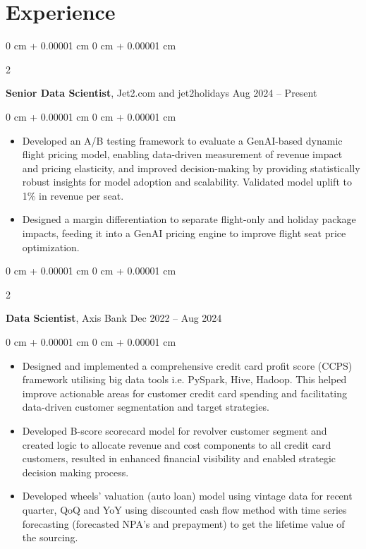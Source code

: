 \documentclass[10pt, letterpaper]{article}
\newenvironment{highlights}{
    \begin{itemize}[
        topsep=0.10 cm,
        parsep=0.10 cm,
        partopsep=0pt,
        itemsep=0pt,
        leftmargin=0 cm + 10pt
    ]
}{
    \end{itemize}
} %
\newenvironment{onecolentry}{
    \begin{adjustwidth}{
        0 cm + 0.00001 cm
    }{
        0 cm + 0.00001 cm
    }
}{
    \end{adjustwidth}
} %
\newenvironment{twocolentry}[2][]{
    \onecolentry
    \def\secondColumn{#2}
    \setcolumnwidth{\fill, 4.5 cm}
    \begin{paracol}{2}
}{
    \switchcolumn \raggedleft \secondColumn
    \end{paracol}
    \endonecolentry
} %
\begin{document}
    
    \section{Experience}



        
        \begin{twocolentry}{
            Aug 2024 – Present
        }
            \textbf{Senior Data Scientist}, Jet2.com and jet2holidays\end{twocolentry}

        \vspace{0.10 cm}
        \begin{onecolentry}
            \begin{highlights}
                \item Developed an A/B testing framework to evaluate a GenAI-based dynamic flight pricing model, enabling data-driven measurement of revenue impact and pricing elasticity, and improved decision-making by providing statistically robust insights for model adoption and scalability. Validated model uplift to 1\% in revenue per seat.
                \item Designed a margin differentiation to separate flight-only and holiday package impacts, feeding it into a GenAI pricing engine to improve flight seat price optimization. \end{highlights} \end{onecolentry}


        \vspace{0.2 cm}

        \begin{twocolentry}{
            Dec 2022 – Aug 2024
        }
            \textbf{Data Scientist}, Axis Bank\end{twocolentry}

        \vspace{0.10 cm}
        \begin{onecolentry}
            \begin{highlights}
                \item 
Designed and implemented a comprehensive credit card profit score (CCPS) framework utilising big data tools i.e. PySpark, Hive, Hadoop. This helped improve actionable areas for customer credit card spending and facilitating data-driven customer segmentation and target strategies. 
                \item 
Developed B-score scorecard model for revolver customer segment and created logic to allocate revenue and cost components to all credit card customers, resulted in enhanced financial visibility and enabled strategic decision making process.
                \item 
                
Developed wheels’ valuation (auto loan) model using vintage data for recent quarter, QoQ and YoY using discounted cash flow method with time series forecasting (forecasted NPA’s and prepayment) to get the lifetime value of the sourcing.



            \end{highlights}
        \end{onecolentry}
\end{document}
